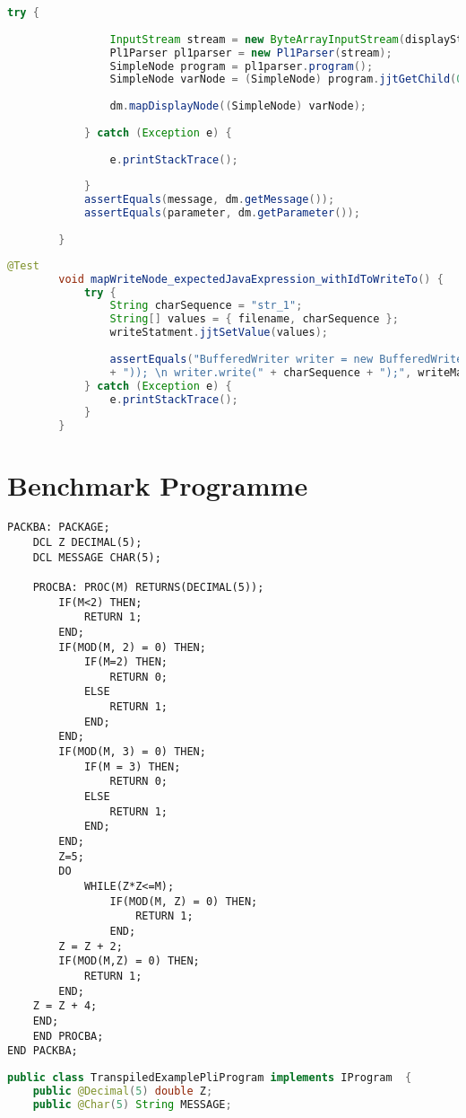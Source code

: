 \begin{appendices}
\begin{lstlisting}[language=Java, caption=Display-Statement Test]
			try {
				
				InputStream stream = new ByteArrayInputStream(displayStatement.getBytes(StandardCharsets.UTF_8));
				Pl1Parser pl1parser = new Pl1Parser(stream);
				SimpleNode program = pl1parser.program();
				SimpleNode varNode = (SimpleNode) program.jjtGetChild(0).jjtGetChild(2).jjtGetChild(1).jjtGetChild(0);
				
				dm.mapDisplayNode((SimpleNode) varNode);
				
			} catch (Exception e) {
				
				e.printStackTrace();
				
			}
			assertEquals(message, dm.getMessage());
			assertEquals(parameter, dm.getParameter());
			
		}
	\end{lstlisting}
\pagebreak
	\begin{lstlisting}[language=Java, caption=Write-Statement Test]
		@Test
		void mapWriteNode_expectedJavaExpression_withIdToWriteTo() {
			try {
				String charSequence = "str_1";
				String[] values = { filename, charSequence };
				writeStatment.jjtSetValue(values);
				
				assertEquals("BufferedWriter writer = new BufferedWriter(new FileWriter(" + filename
				+ ")); \n writer.write(" + charSequence + ");", writeMapper.translate(writeStatment));
			} catch (Exception e) {
				e.printStackTrace();
			}
		}
	\end{lstlisting}
	\endgroup
\pagebreak
\section{Benchmark Programme}\label{sec:benchm}

\begin{lstlisting}[language=PL/I, caption=PL/I-Primzahlen Programm, label={lst:pliprobedivision}]
PACKBA: PACKAGE;
	DCL Z DECIMAL(5);
	DCL MESSAGE CHAR(5);
	
	PROCBA: PROC(M) RETURNS(DECIMAL(5));
		IF(M<2) THEN;
			RETURN 1;
		END;
		IF(MOD(M, 2) = 0) THEN;
			IF(M=2) THEN;
				RETURN 0;
			ELSE
				RETURN 1;
			END;
		END;
		IF(MOD(M, 3) = 0) THEN;
			IF(M = 3) THEN;
				RETURN 0;
			ELSE
				RETURN 1;
			END;
		END;
		Z=5;
		DO
			WHILE(Z*Z<=M);
				IF(MOD(M, Z) = 0) THEN;
					RETURN 1;
				END;
		Z = Z + 2;
		IF(MOD(M,Z) = 0) THEN;
			RETURN 1;
		END;
	Z = Z + 4;
	END;
	END PROCBA;
END PACKBA;
\end{lstlisting}
\pagebreak
\begin{lstlisting}[language=Java, caption=Übersetzes Java-Primzahlen Programm, label={lst:javaprobedivision}]
public class TranspiledExamplePliProgram implements IProgram  { 
	public @Decimal(5) double Z;
	public @Char(5) String MESSAGE;
	

\end{lstlisting}
\end{appendices}
